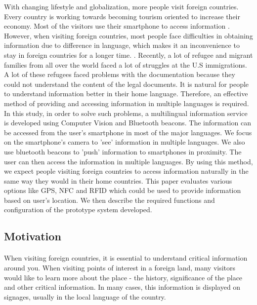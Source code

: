 \documentclass[12pt]{article}
\begin{document}
With changing lifestyle and globalization, more people visit foreign countries. Every country is working towards becoming tourism oriented to increase their economy. Most of the visitors use their smartphone to access information \cite{audioBeacon}. However, when visiting foreign countries, most people face difficulties in obtaining information due to difference in language, which makes it an inconvenience to stay in foreign countries for a longer time. \cite{one}. Recently, a lot of refugee and migrant families from all over the world faced a lot of struggles at the U.S immigrations. A lot of these refugees faced problems with the documentation because they could not understand the content of the legal documents. It is natural for people to understand information better in their home language. Therefore, an effective method of providing and accessing information in multiple languages is required. \\

In this study, in order to solve such problems, a multilingual information service is developed using Computer Vision and Bluetooth beacons. The information can be accessed from the user's smartphone in most of the major languages. We focus on the smartphone's camera to 'see' information in multiple languages. We also use bluetooth beacons to 'push' information to smartphones in proximity. The user can then access the information in multiple languages. By using this method, we expect people visiting foreign countries to access information naturally in the same way they would in their home countries. This paper evaluates various options like GPS, NFC and RFID which could be used to provide information based on user's location. We then describe the required functions and configuration of the prototype system developed. \\

\subsection{Motivation}
\label{motive}
\paragraph{}When visiting foreign countries, it is essential to understand critical information around you. When visiting points of interest in a foreign land, many visitors would like to learn more about the place - the history, significance of the place and other critical information. In many cases, this information is displayed on signages, usually in the local language of the country. 
\end{document}
